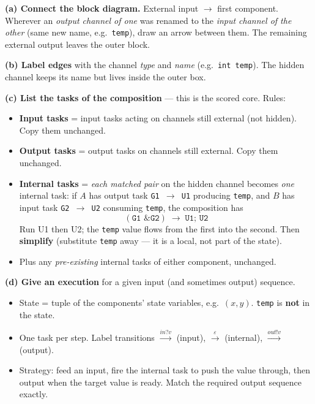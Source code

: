 \textbf{(a) Connect the block diagram.} External input $\rightarrow$ first component. Wherever an \emph{output channel of one} was renamed to the \emph{input channel of the other} (same new name, e.g.\ \texttt{temp}), draw an arrow between them. The remaining external output leaves the outer block.

\textbf{(b) Label edges} with the channel \emph{type} and \emph{name} (e.g.\ \texttt{int temp}). The hidden channel keeps its name but lives inside the outer box.

\textbf{(c) List the tasks of the composition} --- this is the scored core. Rules:
\begin{itemize}
  \item \textbf{Input tasks} = input tasks acting on channels still external (not hidden). Copy them unchanged.
  \item \textbf{Output tasks} = output tasks on channels still external. Copy them unchanged.
  \item \textbf{Internal tasks} = \emph{each matched pair} on the hidden channel becomes \emph{one} internal task: if $A$ has output task \texttt{G1 $\rightarrow$ U1} producing \texttt{temp}, and $B$ has input task \texttt{G2 $\rightarrow$ U2} consuming \texttt{temp}, the composition has
  $$(\texttt{G1 \& G2}) \;\rightarrow\; \texttt{U1; U2}$$
  Run U1 then U2; the \texttt{temp} value flows from the first into the second. Then \textbf{simplify} (substitute \texttt{temp} away --- it is a local, not part of the state).
  \item Plus any \emph{pre-existing} internal tasks of either component, unchanged.
\end{itemize}

\textbf{(d) Give an execution} for a given input (and sometimes output) sequence.
\begin{itemize}
  \item State = tuple of the components' state variables, e.g.\ $(x,y)$. \texttt{temp} is \textbf{not} in the state.
  \item One task per step. Label transitions $\xrightarrow{in?v}$ (input), $\xrightarrow{\varepsilon}$ (internal), $\xrightarrow{out!v}$ (output).
  \item Strategy: feed an input, fire the internal task to push the value through, then output when the target value is ready. Match the required output sequence exactly.
\end{itemize}

